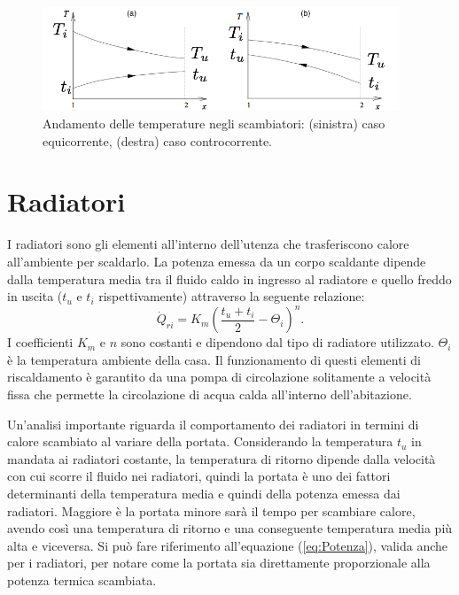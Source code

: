 \documentclass[laurea,oneside,11pt]{USiena_tesiLM}
\begin{document}
\begin{figure}[h]
\begin{center}
\includegraphics[width=0.95\textwidth]{figure/grafico_scambiatore} %
\caption{Andamento delle temperature negli scambiatori: (sinistra) caso equicorrente, (destra) caso controcorrente.}
\label{fig:andamento}
\end{center}
\end{figure}

\section{Radiatori}
\label{subsec:radiatori}
I radiatori sono gli elementi all'interno dell'utenza che trasferiscono calore all'ambiente per scaldarlo. 
La potenza emessa da un corpo scaldante dipende dalla temperatura media tra il fluido caldo in ingresso al radiatore e quello freddo in uscita ($t_u$ e $t_i$ rispettivamente) attraverso la seguente relazione:
\begin{equation}
\dot{Q}_{ri}= K_m(\frac{t_u + t_i}{2} - \Theta_{i})^n .
\label{eq:potenza_radiatori}
\end{equation}
I coefficienti $K_m$ e $n$ sono costanti e dipendono dal tipo di radiatore utilizzato. $\Theta_i$ è la temperatura ambiente della casa. 
Il funzionamento di questi elementi di riscaldamento è garantito da una pompa di circolazione solitamente a velocità fissa che permette la circolazione di acqua calda all'interno dell'abitazione. 

Un'analisi importante riguarda il comportamento dei radiatori in termini di calore scambiato al variare della portata. Considerando la temperatura $t_u$ in mandata ai radiatori costante, la temperatura di ritorno dipende  dalla velocità con cui scorre il fluido nei radiatori, quindi la portata è uno dei fattori determinanti della temperatura media e quindi della potenza emessa dai radiatori. Maggiore è la portata minore sarà il tempo per scambiare calore, avendo così una temperatura di ritorno e una conseguente temperatura media più alta e viceversa. Si può fare riferimento all'equazione (\ref{eq:Potenza}), valida anche per i radiatori, per notare come la portata sia direttamente proporzionale alla potenza termica scambiata. 
\end{document}
